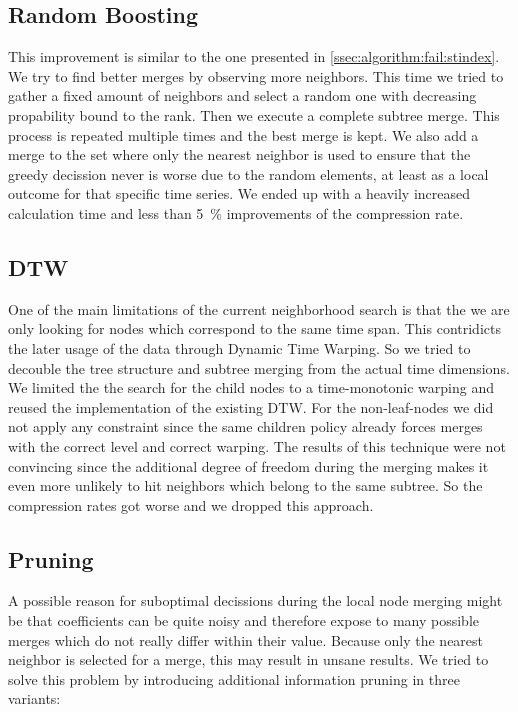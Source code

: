 \subsection{Random Boosting}
\label{ssec:algorithm:fail:random}

This improvement is similar to the one presented in \autoref{ssec:algorithm:fail:stindex}. We try to find better merges by observing more neighbors. This time we tried to gather a fixed amount of neighbors and select a random one with decreasing propability bound to the rank. Then we execute a complete subtree merge. This process is repeated multiple times and the best merge is kept. We also add a merge to the set where only the nearest neighbor is used to ensure that the greedy decission never is worse due to the random elements, at least as a local outcome for that specific time series. We ended up with a heavily increased calculation time and less than \SI{5}{\percent} improvements of the compression rate.


\subsection{DTW}
\label{ssec:algorithm:fail:dtw}

One of the main limitations of the current neighborhood search is that the we are only looking for nodes which correspond to the same time span. This contridicts the later usage of the data through Dynamic Time Warping. So we tried to decouble the tree structure and subtree merging from the actual time dimensions. We limited the the search for the child nodes to a time-monotonic warping and reused the implementation of the existing DTW. For the non-leaf-nodes we did not apply any constraint since the same children policy already forces merges with the correct level and correct warping. The results of this technique were not convincing since the additional degree of freedom during the merging makes it even more unlikely to hit neighbors which belong to the same subtree. So the compression rates got worse and we dropped this approach.


\subsection{Pruning}
\label{ssec:algorithm:fail:pruning}

A possible reason for suboptimal decissions during the local node merging might be that coefficients can be quite noisy and therefore expose to many possible merges which do not really differ within their value. Because only the nearest neighbor is selected for a merge, this may result in unsane results. We tried to solve this problem by introducing additional information pruning in three variants:

